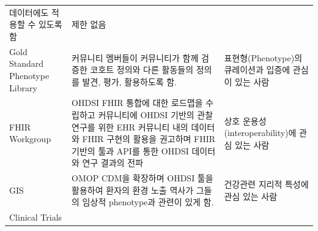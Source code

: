 \documentclass[11pt]{book}
\theoremstyle{definition}
\theoremstyle{definition}
\theoremstyle{definition}
\theoremstyle{remark}
\begin{document}
\begin{longtable}[]{@{}lll@{}}
\begin{minipage}[t]{0.46\columnwidth}
데이터에도 적용할 수 있도록 함\strut
\end{minipage} & \begin{minipage}[t]{0.37\columnwidth}\raggedright\strut
제한 없음\strut
\end{minipage}\tabularnewline
\begin{minipage}[t]{0.09\columnwidth}\raggedright\strut
Gold Standard Phenotype Library\strut
\end{minipage} & \begin{minipage}[t]{0.46\columnwidth}\raggedright\strut
커뮤니티 멤버들이 커뮤니티가 함께 검증한 코호트 정의와 다른 활동들의
정의를 발견, 평가, 활용하도록 함.\strut
\end{minipage} & \begin{minipage}[t]{0.37\columnwidth}\raggedright\strut
표현형(Phenotype)의 큐레이션과 입증에 관심이 있는 사람\strut
\end{minipage}\tabularnewline
\begin{minipage}[t]{0.09\columnwidth}\raggedright\strut
FHIR Workgroup\strut
\end{minipage} & \begin{minipage}[t]{0.46\columnwidth}\raggedright\strut
OHDSI FHIR 통합에 대한 로드맵을 수립하고 커뮤니티에 OHDSI 기반의 관찰
연구를 위한 EHR 커뮤니티 내의 데이터와 FHIR 구현의 활용을 권고하며 FHIR
기반의 툴과 API를 통한 OHDSI 데이터와 연구 결과의 전파\strut
\end{minipage} & \begin{minipage}[t]{0.37\columnwidth}\raggedright\strut
상호 운용성(interoperability)에 관심 있는 사람\strut
\end{minipage}\tabularnewline
\begin{minipage}[t]{0.09\columnwidth}\raggedright\strut
GIS\strut
\end{minipage} & \begin{minipage}[t]{0.46\columnwidth}\raggedright\strut
OMOP CDM을 확장하며 OHDSI 툴을 활용하여 환자의 환경 노출 역사가 그들의
임상적 phenotype과 관련이 있게 함.\strut
\end{minipage} & \begin{minipage}[t]{0.37\columnwidth}\raggedright\strut
건강관련 지리적 특성에 관심 있는 사람\strut
\end{minipage}\tabularnewline
\begin{minipage}[t]{0.09\columnwidth}\raggedright\strut
Clinical Trials\strut
\end{minipage} & \begin{minipage}[t]{0.46\columnwidth}\raggedright\strut

\end{minipage}
\end{longtable}
\end{document}
